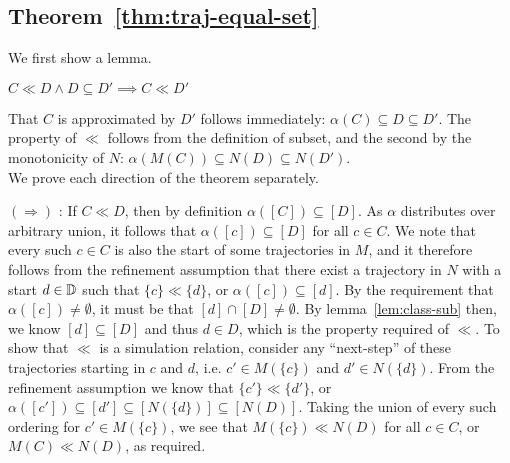 \subsection{Theorem~\ref{thm:traj-equal-set}}

We first show a lemma.

\begin{lemma} \label{lem:ll-sub}
$C \ll D \wedge D \subseteq D' \implies C \ll D'$
\end{lemma}

That $C$ is approximated by $D'$ follows immediately: $\alpha(C) \subseteq D \subseteq D'$. The  property of $\ll$ follows from the definition of subset, and the second by the monotonicity of $N$: $\alpha(M(C)) \subseteq N(D) \subseteq N(D')$. %
\\

We prove each direction of the theorem separately.

$(\Rightarrow)$ : If $C \ll D$, then by definition $\alpha([C]) \subseteq [D]$. As $\alpha$ distributes over arbitrary union, it follows that $\alpha([c]) \subseteq [D]$ for all $c \in C$. We note that every such $c \in C$ is also the start of some trajectories in $M$, and it therefore follows from the refinement assumption that there exist a trajectory in $N$ with a start $d \in \mathbb{D}$ such that $\{ c \} \ll \{ d \}$, or $\alpha([c]) \subseteq [d]$. By the requirement that $\alpha([c]) \neq \emptyset$, it must be that $[d] \cap [D] \neq \emptyset$. By lemma~\ref{lem:class-sub} then, we know $[d] \subseteq [D]$ and thus $d \in D$, which is the  property required of $\ll$. To show that $\ll$ is a simulation relation, consider any ``next-step'' of these trajectories starting in $c$ and $d$, i.e. $c' \in M(\{ c \})$ and $d' \in N(\{ d \})$. From the refinement assumption we know that $\{ c' \} \ll \{ d' \}$, or $\alpha([c']) \subseteq [d'] \subseteq [N(\{ d \})] \subseteq [N(D)]$. Taking the union of every such ordering for $c' \in M(\{ c \})$, we see that $M(\{ c \}) \ll N(D)$ for all $c \in C$, or $M(C) \ll N(D)$, as required.




